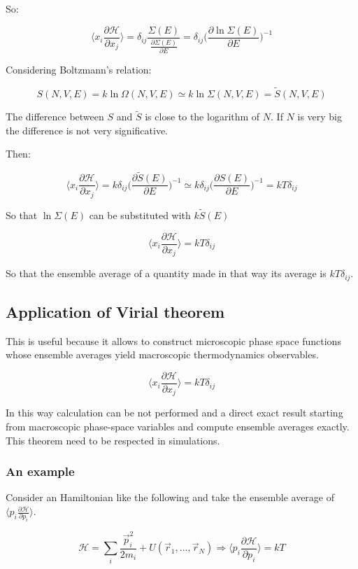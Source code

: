 	So:

	$$\biggl\langle x_i\frac{\partial\mathcal{H}}{\partial x_j}\biggr\rangle = \delta_{ij}\frac{\Sigma(E)}{\frac{\partial\Sigma(E)}{\partial E}} = \delta_{ij}\biggl(\frac{\partial\ln\Sigma(E)}{\partial E}\biggr)^{-1}$$

	Considering Boltzmann's relation:

	$$S(N, V, E) = k\ln\Omega(N, V, E)\simeq k\ln\Sigma(N, V, E) = \tilde{S}(N, V, E)$$

	The difference between $S$ and $\tilde{S}$ is close to the logarithm of $N$.
	If $N$ is very big the difference is not very significative.

	Then:

	$$\biggl\langle x_i\frac{\partial\mathcal{H}}{\partial x_j}\biggr\rangle = k\delta_{ij}\biggl(\frac{\partial\tilde{S}(E)}{\partial E}\biggr)^{-1}\simeq k\delta_{ij}\biggl(\frac{\partial S(E)}{\partial E}\biggr)^{-1} =kT\delta_{ij}$$

	So that $\ln\Sigma(E)$ can be substituted with $k\tilde{S}(E)$

	$$\biggl\langle x_i\frac{\partial\mathcal{H}}{\partial x_j}\biggr\rangle = kT\delta_{ij}$$

	So that the ensemble average of a quantity made in that way its average is $kT\delta_{ij}$.

	\subsection{Application of Virial theorem}
	This is useful because it allows to construct microscopic phase space functions whose ensemble averages yield macroscopic thermodynamics observables.

	$$\biggl\langle x_i\frac{\partial\mathcal{H}}{\partial x_j}\biggr\rangle = kT\delta_{ij}$$

	In this way calculation can be not performed and a direct exact result starting from macroscopic phase-space variables and compute ensemble averages exactly.
	This theorem need to be respected in simulations.


		\subsubsection{An example}
		Consider an Hamiltonian like the following and take the ensemble average of $\biggl\langle p_i\frac{\partial\mathcal{H}}{\partial p_i}\biggr\rangle$.

		$$\mathcal{H} = \sum\limits_i\frac{\vec{p}_i^2}{2m_i} + U(\vec{r}_1, \dots, \vec{r}_N)\Rightarrow\biggl\langle p_i\frac{\partial\mathcal{H}}{\partial p_i}\biggr\rangle = kT$$

